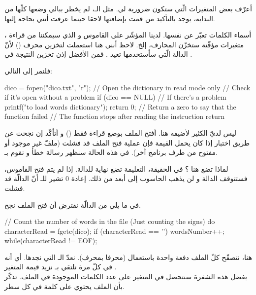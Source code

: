 أعرّف بعض المتغيرات الّتي ستكون ضرورية لي. مثل الـ،
لم يخطر ببالي وضعها كلّها من البداية، يوجد بالتأكيد من قمت بإضافتها لاحقا حينما عرفت أنني بحاجة إليها.

أسماء الكلمات تعبّر عن نفسها. لدينا المؤشّر على القاموس
و الذي سيمكننا من قراءة
،
متغيرات مؤقّتة ستخزّن المحارف، إلخ.
لاحظ أنني هنا استعملت
لتخزين محرف
()
لأنّ الدالة
الّتي سأستخدمها تعيد
.
فمن الأفضل إذن تخزين النتيجة في
.

فلنمر إلى التالي:

\begin{Csource}
dico = fopen("dico.txt", "r"); // Open the dictionary in read mode only
// Check if it's open without a problem
if (dico == NULL) // If there's a problem
{
  printf("\nImpossible to load words dictionary");
  return 0; // Return a zero to say that the function failed
  // The function stops after reading the instruction return
}
\end{Csource}

ليس لديّ الكثير لأضيفه هنا. أفتح الملف
بوضع قراءة فقط
()
و أتأكّد إن نجحت عن طريق اختبار إذا كان
يحمل القيمة
فإن عملية فتح الملف قد فشلت (ملفّ غير موجود أو مفتوح من طرف برنامج آخر). في هذه الحالة سنظهر رسالة خطأ و نقوم بـ.

لماذا تضع
هنا ؟ في الحقيقة، التعليمة
تضع نهاية للدالة. إذا لم يتم فتح القاموس، فستتوقف الدالة و لن يذهب الحاسوب إلى أبعد من ذلك. إعادة 0 تشير للـ
أنّ الدالّة قد فشلت.

في ما يلي من الدالّة نفترض أن فتح الملف نجح.

\begin{Csource}
// Count the number of words in the file (Just counting the \n signs)
do
{
  characterRead = fgetc(dico);
  if (characterRead == '\n')
    wordsNumber++;
} while(characterRead != EOF);
\end{Csource}

هنا، نتصفّح كلّ الملف دفعة واحدة باستعمال
(محرفا بمحرف). نعدّ الـ
التي نجدها. أي أنه في كلّ مرة نلتقي بـ
نزيد قيمة المتغير
.\\
بفضل هذه الشفرة سنتحصل في المتغير
على عدد الكلمات الموجودة في الملف. تذكّر بأن الملف يحتوي على كلمة في كل سطر.

